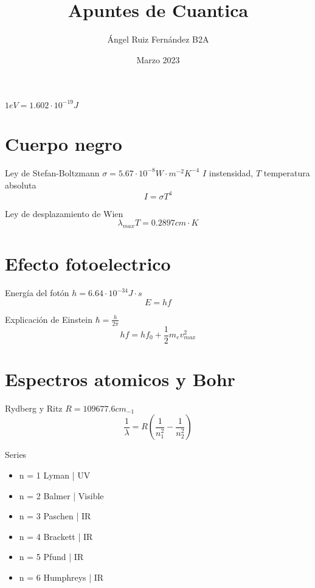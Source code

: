 \documentclass[12pt, letterpaper, twoside]{article}
\title{Apuntes de Cuantica}
\author{Ángel Ruiz Fernández B2A}
\date{Marzo 2023}
\begin{document}
	\maketitle
	
	$1eV = 1.602 \cdot 10^{-19} J$
	
	\section{Cuerpo negro}
	
	Ley de Stefan-Boltzmann $\sigma = 5.67 \cdot 10^{-8} W \cdot m^{-2} K^{-4} $ $I$ instensidad, $T$ temperatura absoluta
	\begin{equation}
		I = \sigma T^4
	\end{equation}
	
	Ley de desplazamiento de Wien	
	\begin{equation}
		\lambda_{max} T = 0.2897 cm \cdot K
	\end{equation}

	\section{Efecto fotoelectrico}
	
	Energía del fotón $h = 6.64 \cdot 10^{-34} J \cdot s$
	\begin{equation}
		E = hf
	\end{equation}

	Explicación de Einstein $\hbar = \frac{h}{2 \pi}$
	\begin{equation}
		hf = hf_0 + \frac{1}{2} m_e v^2_{max}
	\end{equation}

	\section{Espectros atomicos y Bohr}
	Rydberg y Ritz $R = 109677.6 cm_{-1}$
	\begin{equation}
		\frac{1}{\lambda} = R ( \frac{1}{n_{1}^2} - \frac{1}{n^{2}_2})
	\end{equation}

	\pagebreak
	Series
	\begin{itemize}
		\item n = 1 Lyman | UV
		\item n = 2 Balmer | Visible
		\item n = 3 Paschen | IR
		\item n = 4 Brackett | IR
		\item n = 5 Pfund | IR
		\item n = 6 Humphreys | IR
	\end{itemize}
\end{document}
